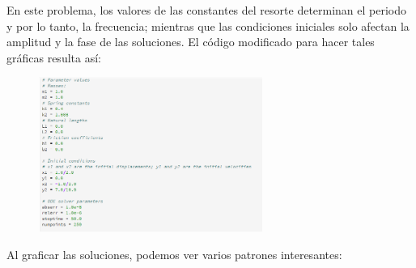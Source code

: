 \documentclass[a4paper]{article}
\begin{document}
En este problema, los valores de las constantes del resorte determinan el periodo y por lo tanto, la frecuencia; mientras que las condiciones iniciales solo afectan la amplitud y la fase de las soluciones. El código modificado para hacer tales gráficas resulta así:

\begin{figure}[ht!]
 \centering
  \includegraphics[width=0.65\textwidth]{Codigo2_2.PNG}
\end{figure}
 
Al graficar las soluciones, podemos ver varios patrones interesantes:
\end{document}
